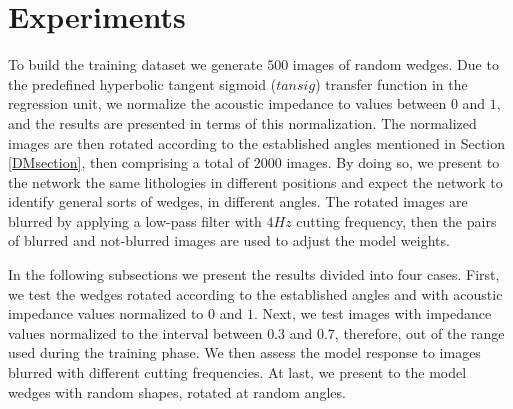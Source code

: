 \documentclass[conference]{IEEEtran}
\begin{document}
\section{Experiments}
To build the training dataset we generate $500$ images of random wedges.
Due to the predefined hyperbolic tangent sigmoid ($tansig$) transfer function in the regression unit,
we normalize the acoustic impedance to values between $0$ and $1$, and the results
are presented in terms of this normalization.
The normalized images are then rotated according to the established angles mentioned in Section \ref{DMsection},
then comprising a total of $2000$ images. By doing so, we present to
the network the same lithologies in different positions and expect the network
to identify general sorts of wedges, in different angles.
The rotated images are blurred by applying a low-pass filter with $4Hz$
cutting frequency, then the pairs of blurred and not-blurred images are used to
adjust the model weights.

In the following subsections we present the results divided into four cases.
First, we test the wedges rotated according to the established angles and with acoustic impedance values normalized to $0$ and $1$. Next, we test images with impedance values normalized to the interval between $0.3$ and $0.7$, therefore, out of the range used during the training phase. %
We then assess the model response to images blurred with different cutting frequencies.
At last, we present to the model wedges with random shapes, rotated at random angles.
\end{document}

